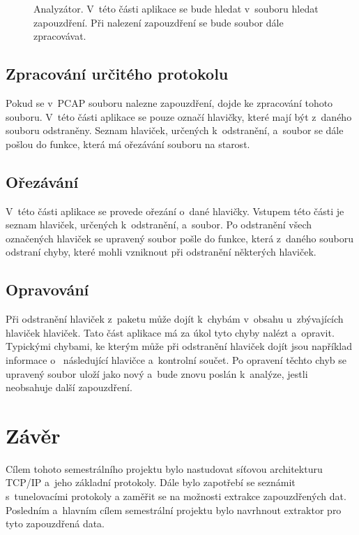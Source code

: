 \begin{figure}[H]
    \centering
    \caption{Analyzátor. V~této části aplikace se bude hledat v~souboru hledat zapouzdření. Při nalezení zapouzdření se bude soubor dále zpracovávat. }
    \label{img:analyzator}
\end{figure}

\section{Zpracování určitého protokolu}
\label{sec:zpracovani}
Pokud se v~PCAP souboru nalezne zapouzdření, dojde ke zpracování tohoto souboru. V~této části aplikace se pouze označí hlavičky, které mají být z~daného souboru odstraněny. Seznam hlaviček, určených k~odstranění, a~soubor se dále pošlou do funkce, která má ořezávání souboru na starost. 

\section{Ořezávání}
\label{sec:orezavani}
V~této části aplikace se provede ořezání o~dané hlavičky. Vstupem této části je seznam hlaviček, určených k~odstranění, a~soubor. Po odstranění všech označených hlaviček se upravený soubor pošle do funkce, která z~daného souboru odstraní chyby, které mohli vzniknout při odstranění některých hlaviček. 

\section{Opravování}
\label{sec:opravovani}
Při odstranění hlaviček z~paketu může dojít k~chybám v~obsahu u~zbývajících hlaviček hlaviček. Tato část aplikace má za úkol tyto chyby nalézt a~opravit. Typickými chybami, ke kterým může při odstranění hlaviček dojít jsou například informace o~ následující hlavičce a~kontrolní součet. Po opravení těchto chyb se upravený soubor uloží jako nový a~bude znovu poslán k~analýze, jestli neobsahuje další zapouzdření. 

\chapter{Závěr}
Cílem tohoto semestrálního projektu bylo nastudovat síťovou architekturu TCP/IP a~jeho základní protokoly. Dále bylo zapotřebí se seznámit s~tunelovacími protokoly a zaměřit se na možnosti extrakce zapouzdřených dat. Posledním a~hlavním cílem semestrální projektu bylo navrhnout extraktor pro tyto zapouzdřená data.

